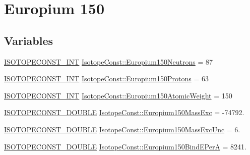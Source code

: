 \hypertarget{group___isotope_const-_europium-_eu150}{}\section{Europium 150}
\label{group___isotope_const-_europium-_eu150}
\subsection*{Variables}
\begin{DoxyCompactItemize}
\item 
\mbox{\hyperlink{group___isotope_const-_macros_ga5f18360b3e99483a35c32d789e62621c}{I\+S\+O\+T\+O\+P\+E\+C\+O\+N\+S\+T\+\_\+\+I\+NT}} \mbox{\hyperlink{group___isotope_const-_europium-_eu150_ga8e7cdd0af095c36938527eb7a54f9ee3}{Isotope\+Const\+::\+Europium150\+Neutrons}} = 87
\item 
\mbox{\hyperlink{group___isotope_const-_macros_ga5f18360b3e99483a35c32d789e62621c}{I\+S\+O\+T\+O\+P\+E\+C\+O\+N\+S\+T\+\_\+\+I\+NT}} \mbox{\hyperlink{group___isotope_const-_europium-_eu150_ga11a53b4c67d3080c839d75ad4e783f1b}{Isotope\+Const\+::\+Europium150\+Protons}} = 63
\item 
\mbox{\hyperlink{group___isotope_const-_macros_ga5f18360b3e99483a35c32d789e62621c}{I\+S\+O\+T\+O\+P\+E\+C\+O\+N\+S\+T\+\_\+\+I\+NT}} \mbox{\hyperlink{group___isotope_const-_europium-_eu150_ga22f2e439c51d2e430595bd47b1851b71}{Isotope\+Const\+::\+Europium150\+Atomic\+Weight}} = 150
\item 
\mbox{\hyperlink{group___isotope_const-_macros_ga8f45a7272ce02c0b4c65c44636ed719a}{I\+S\+O\+T\+O\+P\+E\+C\+O\+N\+S\+T\+\_\+\+D\+O\+U\+B\+LE}} \mbox{\hyperlink{group___isotope_const-_europium-_eu150_gaae96f380e3e9037978fbd80fce1fcd37}{Isotope\+Const\+::\+Europium150\+Mass\+Exc}} = -\/74792.
\item 
\mbox{\hyperlink{group___isotope_const-_macros_ga8f45a7272ce02c0b4c65c44636ed719a}{I\+S\+O\+T\+O\+P\+E\+C\+O\+N\+S\+T\+\_\+\+D\+O\+U\+B\+LE}} \mbox{\hyperlink{group___isotope_const-_europium-_eu150_gadeaaf51ad15ee791c74b1464d01d11c4}{Isotope\+Const\+::\+Europium150\+Mass\+Exc\+Unc}} = 6.
\item 
\mbox{\hyperlink{group___isotope_const-_macros_ga8f45a7272ce02c0b4c65c44636ed719a}{I\+S\+O\+T\+O\+P\+E\+C\+O\+N\+S\+T\+\_\+\+D\+O\+U\+B\+LE}} \mbox{\hyperlink{group___isotope_const-_europium-_eu150_gacd6b9f1b09809d1734b2cc5c6638f357}{Isotope\+Const\+::\+Europium150\+Bind\+E\+PerA}} = 8241.
\item 

\end{DoxyCompactItemize}
